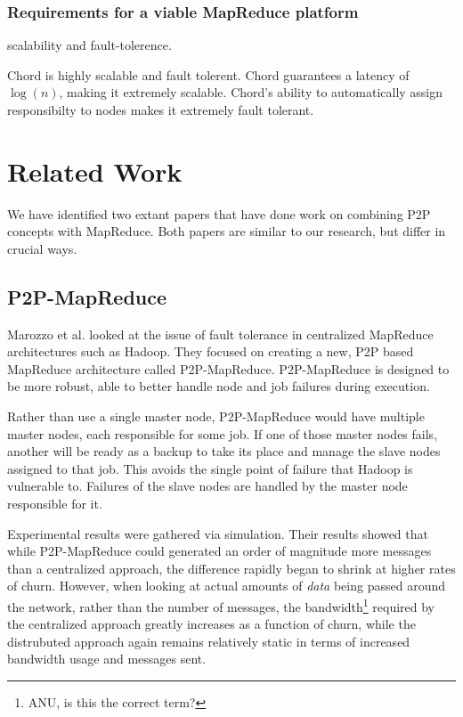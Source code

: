\documentclass[conference, compsocconf, letterpaper]{IEEEtran}
\begin{document}
\subsubsection{Requirements for a viable MapReduce platform}
scalability and fault-tolerence.

Chord is highly scalable and fault tolerent.  Chord guarantees a latency of $\log(n)$, making it extremely scalable.  Chord's ability to automatically assign responsibilty to nodes makes it extremely fault tolerant.  

\section{Related Work}

We have identified two extant papers that have done work on combining P2P concepts with MapReduce.  Both papers are similar to our research, but differ in crucial ways.

\subsection{P2P-MapReduce}
Marozzo et al. \cite{marozzo2012p2p} looked at the issue of fault tolerance in centralized MapReduce architectures such as Hadoop.  They focused on creating a new, P2P based MapReduce architecture called P2P-MapReduce.  P2P-MapReduce is designed to be more robust, able to better handle node and job failures during execution.

Rather than use a single master node, P2P-MapReduce would have multiple master nodes, each responsible for some job.  If one of those master nodes fails, another will be ready as a backup to take its place and manage the slave nodes assigned to that job.  This avoids the single point of failure that Hadoop is vulnerable to. Failures of the slave nodes are handled by the master node responsible for it.

Experimental results were gathered via simulation. Their results showed that while P2P-MapReduce could generated an order of magnitude more messages than a centralized approach, the difference rapidly began to shrink at higher rates of churn.  However, when looking at actual amounts of \emph{data} being passed around the network, rather than the number of messages, the bandwidth\footnote{ANU, is this the correct term?} required by the centralized approach greatly increases as a function of churn, while the distrubuted approach again remains relatively static in terms of increased bandwidth usage and messages sent.  
\end{document}
